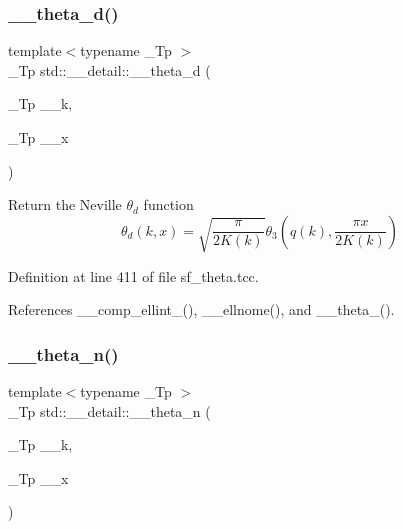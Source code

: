 \mbox{\label{namespacestd_1_1____detail_ad4ca29063a2f624e185592497d37a670}} 
\subsubsection{\texorpdfstring{\+\_\+\+\_\+theta\+\_\+d()}{\_\_theta\_d()}}
{\footnotesize\ttfamily template$<$typename \+\_\+\+Tp $>$ \\
\+\_\+\+Tp std\+::\+\_\+\+\_\+detail\+::\+\_\+\+\_\+theta\+\_\+d (\begin{DoxyParamCaption}\item[{\+\_\+\+Tp}]{\+\_\+\+\_\+k,  }\item[{\+\_\+\+Tp}]{\+\_\+\+\_\+x }\end{DoxyParamCaption})}

Return the Neville $ \theta_d $ function \[ \theta_d(k,x) = \sqrt{\frac{\pi}{2K(k)}} \theta_3\left(q(k),\frac{\pi x}{2K(k)}\right) \] 

Definition at line 411 of file sf\+\_\+theta.\+tcc.



References \+\_\+\+\_\+comp\+\_\+ellint\+\_(), \+\_\+\+\_\+ellnome(), and \+\_\+\+\_\+theta\+\_().

\mbox{\label{namespacestd_1_1____detail_aace76210c8f70761bb14ab602b88d027}} 
\subsubsection{\texorpdfstring{\+\_\+\+\_\+theta\+\_\+n()}{\_\_theta\_n()}}
{\footnotesize\ttfamily template$<$typename \+\_\+\+Tp $>$ \\
\+\_\+\+Tp std\+::\+\_\+\+\_\+detail\+::\+\_\+\+\_\+theta\+\_\+n (\begin{DoxyParamCaption}\item[{\+\_\+\+Tp}]{\+\_\+\+\_\+k,  }\item[{\+\_\+\+Tp}]{\+\_\+\+\_\+x }\end{DoxyParamCaption})}

